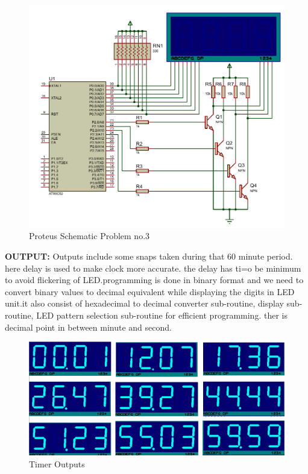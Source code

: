 \documentclass{article}
\begin{document}
\begin{figure}[H]
    \centering
    \includegraphics[scale=0.94,cframe=blue 0.5pt 3pt]{3.PDF}
    \caption{Proteus Schematic Problem no.3}
\end{figure}





\textbf{OUTPUT:}
Outputs include some snaps taken during that 60 minute period. here delay is used to make clock more accurate. the delay has ti=o be minimum to avoid flickering of LED.programming is done in binary format and we need to convert binary values to decimal equivalent while displaying the digits in LED unit.it also consist of hexadecimal to decimal converter sub-routine, display sub-routine, LED pattern selection sub-routine for efficient programming. ther is decimal point in between minute and second.
\begin{figure}[H]
    \centering
    \includegraphics[scale=0.75,cframe=blue 0.5pt 3pt]{prob3 time.jpg}
    \caption{Timer Outputs}
\end{figure}
\end{document}
